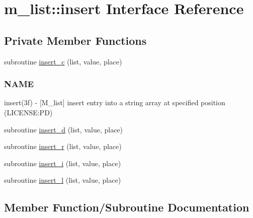 \hypertarget{interfacem__list_1_1insert}{}\section{m\+\_\+list\+:\+:insert Interface Reference}
\label{interfacem__list_1_1insert}
\subsection*{Private Member Functions}
\begin{DoxyCompactItemize}
\item 
subroutine \mbox{\hyperlink{interfacem__list_1_1insert_a742ebd548e7a83112b3a82280946a5d4}{insert\+\_\+c}} (list, value, place)
\begin{DoxyCompactList}\small\item\em \subsubsection*{N\+A\+ME}

insert(3f) -\/ \mbox{[}M\+\_\+list\mbox{]} insert entry into a string array at specified position (L\+I\+C\+E\+N\+SE\+:PD) \end{DoxyCompactList}\item 
subroutine \mbox{\hyperlink{interfacem__list_1_1insert_ae044e850bd7b5dae0d979e10110a8f1b}{insert\+\_\+d}} (list, value, place)
\item 
subroutine \mbox{\hyperlink{interfacem__list_1_1insert_a644fd8539d1489bb0e1c45f5da42ecb4}{insert\+\_\+r}} (list, value, place)
\item 
subroutine \mbox{\hyperlink{interfacem__list_1_1insert_ad841a688476fbbd90d735f42c69e1edf}{insert\+\_\+i}} (list, value, place)
\item 
subroutine \mbox{\hyperlink{interfacem__list_1_1insert_a00c923bee9588fb3f3089990dd24e096}{insert\+\_\+l}} (list, value, place)
\end{DoxyCompactItemize}


\subsection{Member Function/\+Subroutine Documentation}
\mbox{\label{interfacem__list_1_1insert_a742ebd548e7a83112b3a82280946a5d4}} 
